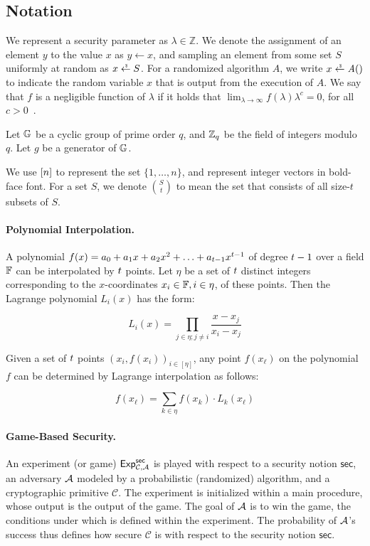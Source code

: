 \subsection{Notation} \label{notation}

We represent a security parameter as $\lambda \in \mathbb{Z}$.
We denote the assignment of an element $y$ to the value $x$ as $y \gets x$,
and sampling an element from some set $S$ uniformly at random as $x \rgets S$.
For a randomized algorithm $\mathit{A}$, we write $x \rgets \mathit{A}()$ to indicate the random variable $x$ that is output from the execution of $\mathit{A}$.
We say that $f$ is a negligible function of $\lambda$ if it holds that
$\lim_{\lambda \to \infty} f(\lambda) \lambda^c = 0$,
for all $ c > 0$~\cite{BonehS2020}.

Let $\mathbb{G}$ be a cyclic group of prime order $q$, and $\mathbb{Z}_q$ be the field of integers modulo $q$.
Let $g$ be a generator of $\mathbb{G}$.

We use $[n]$ to represent the set $\{1,\ldots,n \}$,
and represent integer vectors in bold-face font.
For a set $S$,
we denote ${S \choose t}$ to mean the set
that consists of all size-$t$ subsets of $S$.

\paragraph{Polynomial Interpolation.}
A polynomial $f(x) = a_0 + a_1 x + a_2 x^2 + \ldots + a_{t-1} x^{t-1}$
of degree $t-1$ over a field $\mathbb{F}$ can be interpolated by $t$ points.
Let $\eta$ be a set of $t$ distinct integers
corresponding to the $x$-coordinates $x_i \in \mathbb{F}, i \in \eta$, of these points.
Then the Lagrange polynomial $L_i(x)$ has the form:

\begin{equation}\label{eqn:lagrange}
L_i(x) = \prod_{j \in \eta; j \neq i } \frac{x-x_j}{x_i - x_j}
\end{equation}

Given a set of $t$ points $(x_i, f(x_i))_{i \in [\eta]}$, any point $f(x_\ell)$ on the polynomial $f$ can be determined by Lagrange interpolation as follows:

\[ f(x_\ell) = \sum_{k \in \eta} f(x_k) \cdot L_k(x_\ell) \]

\paragraph{Game-Based Security.}
An experiment (or game) $\textsf{Exp}_{\mathcal{C}, \mathcal{A}}^{\mathsf{sec}}$ is
played with respect to a security notion $\mathsf{sec}$,
an adversary $\mathcal{A}$ modeled by a probabilistic (randomized) algorithm,
and a cryptographic primitive $\mathcal{C}$.
The experiment is initialized within a main procedure,
whose output is the output of the game.
The goal of $\mathcal{A}$ is to win the game,
the conditions under which is defined within the experiment.
The probability of $\mathcal{A}$'s success thus defines how secure $\mathcal{C}$ is with respect to the security notion $\mathsf{sec}$.

